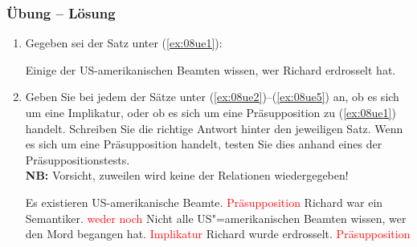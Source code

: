 
\begin{frame}
\frametitle{Übung -- Lösung}
	
	\begin{enumerate}
		\item Gegeben sei der Satz unter (\ref{ex:08ue1}):
		
	\begin{exe}
		 Einige der US-amerikanischen Beamten wissen, wer Richard erdrosselt hat.
	\end{exe}

		\item [] Geben Sie bei jedem der Sätze unter (\ref{ex:08ue2})--(\ref{ex:08ue5}) an, ob es sich um eine Implikatur, oder ob es sich um eine Präsupposition zu (\ref{ex:08ue1}) handelt. Schreiben Sie die richtige Antwort hinter den jeweiligen Satz. Wenn es sich um eine Präsupposition handelt, testen Sie dies anhand eines der Präsuppositionstests. \\
		\textbf{NB:} Vorsicht, zuweilen wird keine der Relationen wiedergegeben!
	\begin{exe}
		 Es existieren US-amerikanische Beamte. \textcolor{red}{\ras Präsupposition}
		 Richard war ein Semantiker. \textcolor{red}{\ras weder noch}
		 Nicht alle US"=amerikanischen Beamten wissen, wer den Mord begangen hat. \textcolor{red}{\ras Implikatur}
		 Richard wurde erdrosselt. \textcolor{red}{\ras Präsupposition}
	\end{exe}

	\end{enumerate}
	
\end{frame}


